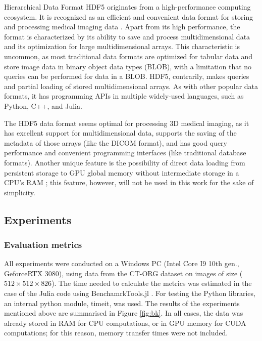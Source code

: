 \documentclass{juliacon}
\begin{document}
Hierarchical Data Format HDF5 \cite{hdf5} originates from a high-performance computing ecosystem. It is recognized as an efficient and convenient data format for storing and processing medical imaging data \cite{hdf5Medical}. Apart from its high performance, the format is characterized by its ability to save and process multidimensional data and its optimization for large multidimensional arrays. This characteristic is uncommon, as most traditional data formats are optimized for tabular data and store image data in binary object data types (BLOB), with a limitation that no queries can be performed for data in a BLOB. HDF5, contrarily, makes queries and partial loading of stored multidimensional arrays. As with other popular data formats, it has programming APIs in multiple widely-used languages, such as Python, C++, and Julia.

The HDF5 data format seems optimal for processing 3D medical imaging, as it has excellent support for multidimensional data, supports the saving of the metadata of those arrays (like the DICOM format), and has good query performance and convenient programming interfaces (like traditional database formats). Another unique feature is the possibility of direct data loading from persistent storage to GPU global memory without intermediate storage in a CPU's RAM  \cite{hdf5GPU}; this feature, however, will not be used in this work for the sake of simplicity.

\subsection{Experiments}
\subsubsection{Evaluation metrics}
All experiments were conducted on a Windows PC (Intel Core I9 10th gen., GeforceRTX 3080), using data from the CT-ORG \cite{CTORG} dataset on images of size ($512 \times 512 \times 826$). The time needed to calculate the metrics was estimated in the case of the Julia code using BenchamrkTools.jl \cite{BenchmarkTools}. For testing the Python libraries, an internal python module, timeit, was used. The results of the experiments mentioned above are summarised in Figure \ref{fig:bk}. In all cases, the data was already stored in RAM for CPU computations, or in GPU memory for CUDA computations; for this reason, memory transfer times were not included.
\end{document}
